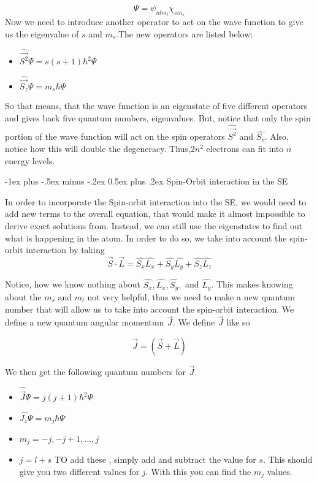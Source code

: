 \documentclass[10pt,landscape]{article}
\makeatletter
\renewcommand{\section}{\@startsection{section}{1}{0mm}%
                                {-1ex plus -.5ex minus -.2ex}%
                                {0.5ex plus .2ex}%
                                {\normalfont\large\bfseries}}
\makeatother
\begin{document}
\begin{multicols}{3}
\begin{equation*}
    \Psi=\psi_{nlm_l}\chi_{sm_s}
\end{equation*}
Now we need to introduce another operator to act on the wave function to give us the eigenvalue of $s$ and $m_s$.The new operators are listed below:
\begin{itemize}
    \item $\hat{\Vec{S^2}} \Psi=s(s+1)\hbar^2 \Psi$
    \item $\hat{\Vec{S_z}}\Psi=m_s\hbar \Psi$
\end{itemize}{}
So that means, that the wave function is an eigenstate of five different operators and gives back five quantum numbers, eigenvalues. But, notice that only the spin portion of the wave function will act on the spin operators $\hat{\vec{S^2}}$ and $\hat{S_z}$. Also, notice how this will double the degeneracy. Thus,$2n^2$ electrons can fit into $n$ energy levels.

\section{Spin-Orbit interaction in the SE}

In order to incorporate the Spin-orbit interaction into the SE, we would need to add new terms to the overall equation, that would make it almost impossible to derive exact solutions from. Instead, we can still use the eigenstates to find out what is happening in the atom. In order to do so, we take into account the spin-orbit interaction by taking 
\begin{equation*}
    \vec{S} \cdot \vec{L}= \hat{S_x}\hat{L_x}+\hat{S_y}\hat{L_y}+\hat{S_z}\hat{L_z}
\end{equation*}{}

Notice, how we know nothing about $\hat{S_x},\hat{L_x},\hat{S_y},$ and $ \hat{L_y}$. This makes knowing about the $m_s$ and $m_l$ not very helpful, thus we need to make a new quantum number that will allow us to take into account the spin-orbit interaction. We define a new quantum angular momentum $\vec{J}$. We define $\vec{J}$ like so

\begin{equation*}
\vec{J}=(\vec{S}+\vec{L}) 
\end{equation*}{}

We then get the following quantum numbers for $\vec{J}$.
\begin{itemize}
\item $\hat{\vec{J}}\Psi=j(j+1)\hbar^{2}\Psi$
\item $\hat{J_{z}}\Psi=m_{j}\hbar\Psi$
\item $m_{j}=-j,-j+1,...,j$
\item $j=l+s$ TO add these , simply add and subtract the value for $s$. This should give you two different values for $j$. With this you can find the $m_j$ values.
\end{itemize}

\end{multicols}
\end{document}
